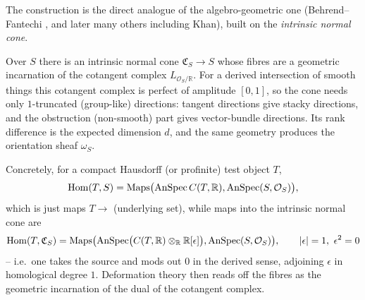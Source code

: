 The construction is the direct analogue of the algebro-geometric one (Behrend--%
Fantechi \cite{behrend1996intrinsicnormalcone}, and later many others including
Khan), built on the \emph{intrinsic normal cone}.

\begin{remark}
\label{rmk:24:intrinsic-cone}
Over $S$ there is an intrinsic normal cone $\mathfrak C_S\to S$ whose fibres are a
geometric incarnation of the cotangent complex $L_{\mathcal O_S/\mathbb R}$. For a
derived intersection of smooth things this cotangent complex is perfect of
amplitude $[0,1]$, so the cone needs only $1$-truncated (group-like) directions:
tangent directions give stacky directions, and the obstruction (non-smooth) part
gives vector-bundle directions. Its rank difference is the expected dimension $d$,
and the same geometry produces the orientation sheaf $\omega_S$.
\end{remark}

Concretely, for a compact Hausdorff (or profinite) test object $T$,
\begin{equation*}
\operatorname{Hom}(T,S)=\operatorname{Maps}\bigl(\operatorname{AnSpec} C(T,\mathbb R),\operatorname{AnSpec}(S,\mathcal O_S)\bigr),
\end{equation*}
which is just maps $T\to$ (underlying set), while maps into the intrinsic normal
cone are
\begin{equation*}
\operatorname{Hom}(T,\mathfrak C_S)=\operatorname{Maps}\bigl(\operatorname{AnSpec}\bigl(C(T,\mathbb R)\otimes_{\mathbb R}
\mathbb R[\epsilon]\bigr),\operatorname{AnSpec}(S,\mathcal O_S)\bigr),
\qquad |\epsilon|=1,\ \epsilon^2=0
\end{equation*}
-- i.e.\ one takes the source and mods out $0$ in the derived sense, adjoining
$\epsilon$ in homological degree $1$. Deformation theory then reads off the fibres
as the geometric incarnation of the dual of the cotangent complex.


